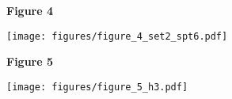\documentclass[8pt]{extarticle}
\begin{document}
\newpage

\textbf{\large Figure 4}
\vspace{5.5pt}

\texttt{[image: figures/figure\_4\_set2\_spt6.pdf]}


\newpage

\textbf{\large Figure 5}

\texttt{[image: figures/figure\_5\_h3.pdf]}
\end{document}
